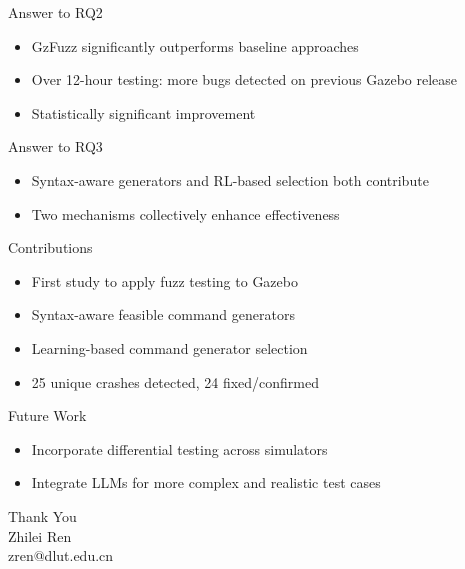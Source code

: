 \documentclass{beamer}
\begin{document}
\begin{frame}{Answer to RQ2}
\begin{itemize}
\item GzFuzz significantly outperforms baseline approaches
\item Over 12-hour testing: more bugs detected on previous Gazebo release
\item Statistically significant improvement
\end{itemize}
\end{frame}

\begin{frame}{Answer to RQ3}
\begin{itemize}
\item Syntax-aware generators and RL-based selection both contribute
\item Two mechanisms collectively enhance effectiveness
\end{itemize}
\end{frame}

\begin{frame}{Contributions}
\begin{itemize}
\item First study to apply fuzz testing to Gazebo
\item Syntax-aware feasible command generators
\item Learning-based command generator selection
\item 25 unique crashes detected, 24 fixed/confirmed
\end{itemize}
\end{frame}

\begin{frame}{Future Work}
\begin{itemize}
\item Incorporate differential testing across simulators
\item Integrate LLMs for more complex and realistic test cases
\end{itemize}
\end{frame}

\begin{frame}
\centering
\Large
Thank You\\
\vspace{1cm}
Zhilei Ren\\
\small
zren@dlut.edu.cn
\end{frame}
\end{document}
